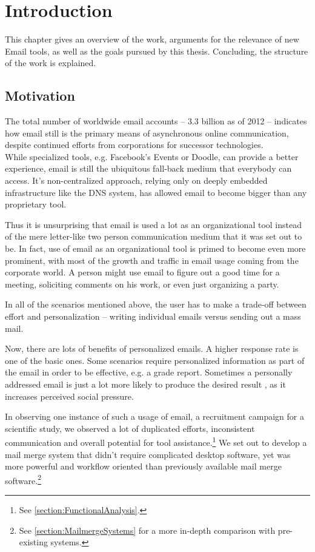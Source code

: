 \chapter{Introduction}
\label{chapter:Introduction}

This chapter gives an overview of the work, arguments for the relevance of new Email tools, as well as the goals pursued by this thesis. Concluding, the structure of the work is explained.

\section{Motivation}

The total number of worldwide email accounts -- 3.3 billion as of 2012 \citep{emailreport} -- indicates how email still is the primary means of asynchronous online communication, despite continued efforts from corporations for successor technologies. \\
While specialized tools, e.g. Facebook's Events or Doodle, can provide a better experience, email is still the ubiquitous fall-back medium that everybody can access. It's non-centralized approach, relying only on deeply embedded infrastructure like the DNS system, has allowed email to become bigger than any proprietary tool.

Thus it is unsurprising that email is used a lot as an organizational tool instead of the mere letter-like two person communication medium that it was set out to be. In fact, use of email as an organizational tool is primed to become even more prominent, with most of the growth and traffic in email usage coming from the corporate world. \citep[p. 3]{emailreport} A person might use email to figure out a good time for a meeting, soliciting comments on his work, or even just organizing a party.

In all of the scenarios mentioned above, the user has to make a trade-off between effort and personalization -- writing individual emails versus sending out a mass mail.

Now, there are lots of benefits of personalized emails. A higher response rate is one of the basic ones. Some scenarios require personalized information as part of the email in order to be effective, e.g. a grade report. Sometimes a personally addressed email is just a lot more likely to produce the desired result \citep[p. 1375, 1380]{emailsalutation}, as it increases perceived social pressure.

In observing one instance of such a usage of email, a recruitment campaign for a scientific study, we observed a lot of duplicated efforts, inconsistent communication and overall potential for tool assistance.\footnote{See \autoref{section:FunctionalAnalysis}.} We set out to develop a mail merge system that didn't require complicated desktop software, yet was more powerful and workflow oriented than previously available mail merge software.\footnote{See \autoref{section:MailmergeSystems} for a more in-depth comparison with pre-existing systems.}

